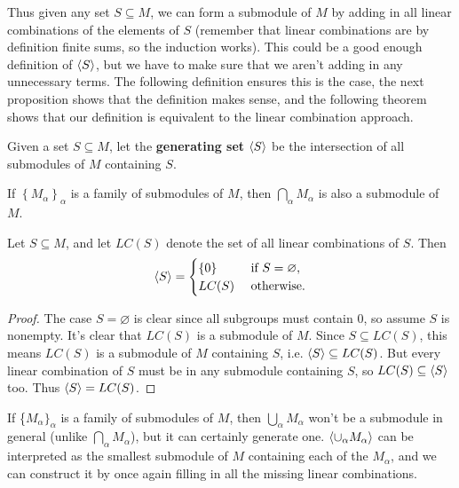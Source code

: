 \documentclass[twoside,10pt]{report}
\begin{document}
Thus given any set $S \subseteq M$, we can form a submodule of $M$ by adding in all linear combinations of the elements of $S$ (remember that linear combinations are by definition finite sums, so the induction works). This could be a good enough definition of $\langle S \rangle$, but we have to make sure that we aren't adding in any unnecessary terms. The following definition ensures this is the case, the next proposition shows that the definition makes sense, and the following theorem shows that our definition is equivalent to the linear combination approach.

\begin{defn}[]
Given a set $S \subseteq M$, let the \textbf{generating set} $\langle S \rangle$ be the intersection of all submodules of $M$ containing $S$.
\end{defn}

\begin{prop}
If $\left\{ M_{\alpha} \right\}_{\alpha}$ is a family of submodules of $M$, then $\bigcap_{\alpha}M_{\alpha}$ is also a submodule of $M$.
\end{prop}

\begin{thrm}[]
	\label{thrm:LC}
	Let $S \subseteq M$, and let $LC(S)$ denote the set of all linear combinations of $S$. Then
	\[
	\langle S \rangle=
	\begin{cases}
		\left\{ 0 \right\} & \text{ if } S = \varnothing,\\
		LC(S) & \text{ otherwise}.
	\end{cases}
	\] 
\end{thrm}
\begin{proof}
	The case $S = \varnothing$ is clear since all subgroups must contain 0, so assume $S$ is nonempty. It's clear that $LC(S)$ is a submodule of $M$. Since $S \subseteq LC(S)$, this means $LC(S)$ is a submodule of $M$ containing $S$, i.e. $\langle S \rangle \subseteq LC(S)$. But every linear combination of $S$ must be in any submodule containing $S$, so $LC(S) \subseteq \langle S \rangle$ too. Thus $\langle S \rangle= LC(S)$.
\end{proof}

If \{$M_{\alpha}\}_{\alpha}$ is a family of submodules of $M$, then $\bigcup_{\alpha}M_{\alpha}$ won't be a submodule in general (unlike $\bigcap_{\alpha}M_\alpha$), but it can certainly generate one. $\langle \cup_{\alpha}M_{\alpha} \rangle$ can be interpreted as the smallest submodule of $M$ containing each of the $M_{\alpha}$, and we can construct it by once again filling in all the missing linear combinations.
\end{document}
